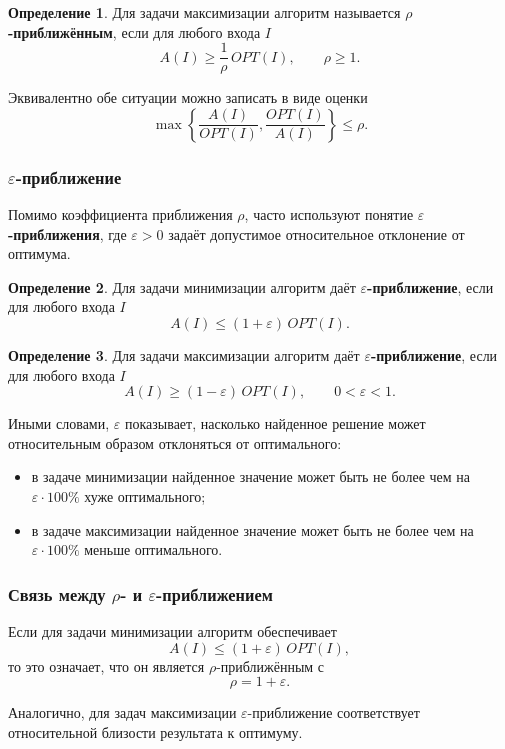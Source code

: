 \documentclass[12pt,a4paper]{article}
\theoremstyle{definition}
\newtheorem{definition}{Определение}[section]
\theoremstyle{plain}
\begin{document}
\begin{definition}
Для задачи максимизации алгоритм называется \textbf{$\rho$-приближённым}, если для любого входа $I$
\[
A(I)\ge \frac{1}{\rho}\,OPT(I), \qquad \rho\ge 1.
\]
\end{definition}

Эквивалентно обе ситуации можно записать в виде оценки
\[
\max\left\{\frac{A(I)}{OPT(I)},\frac{OPT(I)}{A(I)}\right\}\le \rho.
\]

\subsubsection{$\varepsilon$-приближение}
Помимо коэффициента приближения $\rho$, часто используют понятие \textbf{$\varepsilon$-приближения}, где $\varepsilon>0$ задаёт допустимое относительное отклонение от оптимума.

\begin{definition}
Для задачи минимизации алгоритм даёт \textbf{$\varepsilon$-приближение}, если для любого входа $I$
\[
A(I)\le (1+\varepsilon)\,OPT(I).
\]
\end{definition}

\begin{definition}
Для задачи максимизации алгоритм даёт \textbf{$\varepsilon$-приближение}, если для любого входа $I$
\[
A(I)\ge (1-\varepsilon)\,OPT(I),
\qquad 0<\varepsilon<1.
\]
\end{definition}

Иными словами, $\varepsilon$ показывает, насколько найденное решение может относительным образом отклоняться от оптимального:
\begin{itemize}
\item в задаче минимизации найденное значение может быть не более чем на $\varepsilon\cdot 100\%$ хуже оптимального;
\item в задаче максимизации найденное значение может быть не более чем на $\varepsilon\cdot 100\%$ меньше оптимального.
\end{itemize}

\subsubsection{Связь между $\rho$- и $\varepsilon$-приближением}
Если для задачи минимизации алгоритм обеспечивает
\[
A(I)\le (1+\varepsilon)\,OPT(I),
\]
то это означает, что он является $\rho$-приближённым с
\[
\rho=1+\varepsilon.
\]

Аналогично, для задач максимизации $\varepsilon$-приближение соответствует относительной близости результата к оптимуму.
\end{document}
